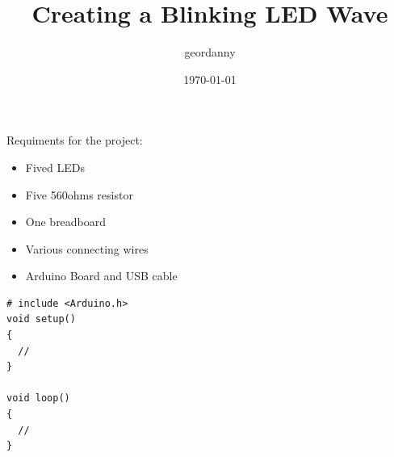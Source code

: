 \documentclass[11pt]{article}
\author{geordanny}
\date{\today}
\title{Creating a Blinking LED Wave}
\begin{document}
\maketitle
\tableofcontents

Requiments for the project:
\begin{itemize}
\item Fived LEDs
\item Five 560ohms resistor
\item One breadboard
\item Various connecting wires
\item Arduino Board and USB cable
\end{itemize}



\begin{verbatim}
# include <Arduino.h>
void setup()
{
  //
}

void loop()
{
  //
}
\end{verbatim}
\end{document}
